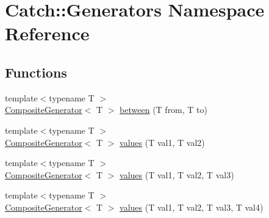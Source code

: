 \hypertarget{namespaceCatch_1_1Generators}{\section{Catch\-:\-:Generators Namespace Reference}
\label{namespaceCatch_1_1Generators}
}
\subsection*{Functions}
\begin{DoxyCompactItemize}
\item 
{\footnotesize template$<$typename T $>$ }\\\hyperlink{classCatch_1_1CompositeGenerator}{Composite\-Generator}$<$ T $>$ \hyperlink{namespaceCatch_1_1Generators_a030abfa7ee3c58d909cf6a6aa0405265}{between} (T from, T to)
\item 
{\footnotesize template$<$typename T $>$ }\\\hyperlink{classCatch_1_1CompositeGenerator}{Composite\-Generator}$<$ T $>$ \hyperlink{namespaceCatch_1_1Generators_a7a2c5bebb3c06c5b0ca05a80289b9eb1}{values} (T val1, T val2)
\item 
{\footnotesize template$<$typename T $>$ }\\\hyperlink{classCatch_1_1CompositeGenerator}{Composite\-Generator}$<$ T $>$ \hyperlink{namespaceCatch_1_1Generators_a496c4a826107e47203b6c609cfd8c2c5}{values} (T val1, T val2, T val3)
\item 
{\footnotesize template$<$typename T $>$ }\\\hyperlink{classCatch_1_1CompositeGenerator}{Composite\-Generator}$<$ T $>$ \hyperlink{namespaceCatch_1_1Generators_afb1dcf02bfc8cdf990f27fdc7d7e4a4e}{values} (T val1, T val2, T val3, T val4)
\end{DoxyCompactItemize}



